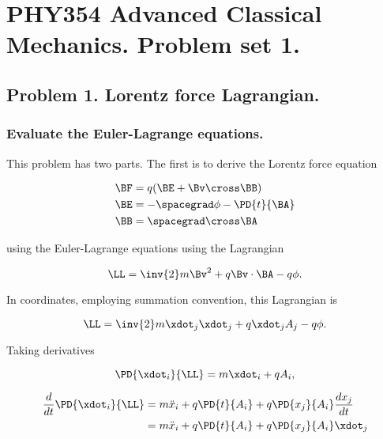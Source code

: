 
%

\chapter{PHY354 Advanced Classical Mechanics.  Problem set 1.}
\label{chap:classicalMechanicsPs1}
{}
\date{Jan 24, 2012}

\beginArtWithToc

\section{Problem 1.  Lorentz force Lagrangian.}
\subsection{Evaluate the Euler-Lagrange equations.}

This problem has two parts.   The first is to derive the Lorentz force equation

\begin{align}\label{eqn:classicalMechanicsPs1:n}
\BF &= q (\BE + \Bv \cross \BB) \\
\BE &= -\spacegrad \phi - \PD{t}{\BA} \\
\BB &= \spacegrad \cross \BA
\end{align}

using the Euler-Lagrange equations using the Lagrangian

\begin{equation}\label{eqn:classicalMechanicsPs1:n}
\LL = \inv{2} m \Bv^2 + q \Bv \cdot \BA - q \phi.
\end{equation}

In coordinates, employing summation convention, this Lagrangian is

\begin{equation}\label{eqn:classicalMechanicsPs1:n}
\LL = \inv{2} m \xdot_j \xdot_j + q \xdot_j A_j - q \phi.
\end{equation}

Taking derivatives

\begin{equation}\label{eqn:classicalMechanicsPs1:n}
\PD{\xdot_i}{\LL} = m \xdot_i + q A_i,
\end{equation}

\begin{align*}
\frac{d}{dt} \PD{\xdot_i}{\LL} 
&= 
m \ddot{x}_i 
+ q \PD{t}{A_i}
+ q \PD{x_j}{A_i} \frac{dx_j}{dt} \\
&=
m \ddot{x}_i 
+ q \PD{t}{A_i}
+ q \PD{x_j}{A_i} \xdot_j
\end{align*}

